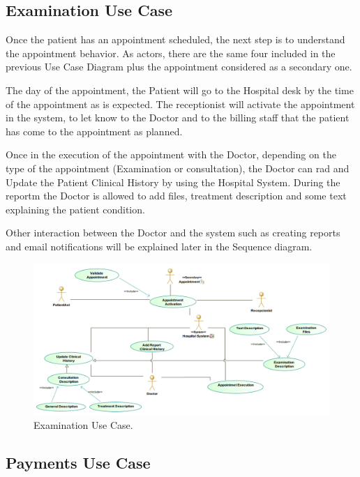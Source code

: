 \documentclass{article}
\begin{document}
            \subsection{Examination Use Case}

            Once the patient has an appointment scheduled, the next step is to understand the appointment behavior. As actors, there are the same four included in the previous Use Case Diagram plus the appointment considered as a 
            secondary one.

            The day of the appointment, the Patient will go to the Hospital desk by the time of the appointment as is expected. The receptionist will activate the appointment in the system, to let know to the Doctor and to the billing 
            staff that the patient has come to the appointment as planned.

            Once in the execution of the appointment with the Doctor, depending on the type of the appointment (Examination or consultation), the Doctor can rad and Update the Patient Clinical History by using the Hospital System. During the reportm
            the Doctor is allowed to add files, treatment description and some text explaining the patient condition.

            Other interaction between the Doctor and the system such as creating reports and email notifications will be explained later in the Sequence diagram.
            \begin{figure}[H]
                \centering 
                \includegraphics[width=1\linewidth]{./img/cHistories.png}
                \caption{Examination Use Case.}
                \label{fig:examination}
            \end{figure}
            
            \subsection{Payments Use Case}
\end{document}
